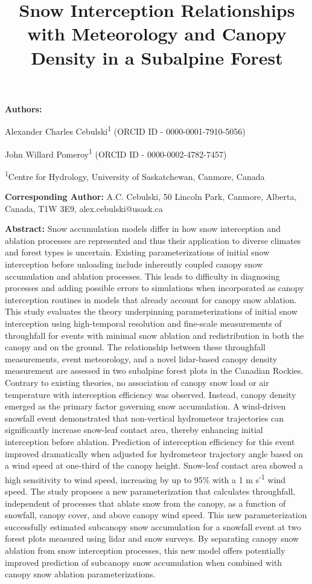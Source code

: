 \documentclass[
  letterpaper,
  DIV=11,
  numbers=noendperiod]{scrartcl}
\title{Snow Interception Relationships with Meteorology and Canopy
Density in a Subalpine Forest}
\author{}
\date{}
\begin{document}
\maketitle



\textbf{Authors:}

Alexander Charles Cebulski\textsuperscript{1} (ORCID ID -
0000-0001-7910-5056)

John Willard Pomeroy\textsuperscript{1} (ORCID ID - 0000-0002-4782-7457)

\textsuperscript{1}Centre for Hydrology, University of Saskatchewan,
Canmore, Canada

\textbf{Corresponding Author:} A.C. Cebulski, 50 Lincoln Park, Canmore,
Alberta, Canada, T1W 3E9, alex.cebulski@usask.ca

\textbf{Abstract:} Snow accumulation models differ in how snow
interception and ablation processes are represented and thus their
application to diverse climates and forest types is uncertain. Existing
parameterizations of initial snow interception before unloading include
inherently coupled canopy snow accumulation and ablation processes. This
leads to difficulty in diagnosing processes and adding possible errors
to simulations when incorporated as canopy interception routines in
models that already account for canopy snow ablation. This study
evaluates the theory underpinning parameterizations of initial snow
interception using high-temporal resolution and fine-scale measurements
of throughfall for events with minimal snow ablation and redistribution
in both the canopy and on the ground. The relationship between these
throughfall measurements, event meteorology, and a novel lidar-based
canopy density measurement are assessed in two subalpine forest plots in
the Canadian Rockies. Contrary to existing theories, no association of
canopy snow load or air temperature with interception efficiency was
observed. Instead, canopy density emerged as the primary factor
governing snow accumulation. A wind-driven snowfall event demonstrated
that non-vertical hydrometeor trajectories can significantly increase
snow-leaf contact area, thereby enhancing initial interception before
ablation. Prediction of interception efficiency for this event improved
dramatically when adjusted for hydrometeor trajectory angle based on a
wind speed at one-third of the canopy height. Snow-leaf contact area
showed a high sensitivity to wind speed, increasing by up to 95\% with a
1 m s\textsuperscript{-1} wind speed. The study proposes a new
parameterization that calculates throughfall, independent of processes
that ablate snow from the canopy, as a function of snowfall, canopy
cover, and above canopy wind speed. This new parameterization
successfully estimated subcanopy snow accumulation for a snowfall event
at two forest plots measured using lidar and snow surveys. By separating
canopy snow ablation from snow interception processes, this new model
offers potentially improved prediction of subcanopy snow accumulation
when combined with canopy snow ablation parameterizations.
\end{document}
